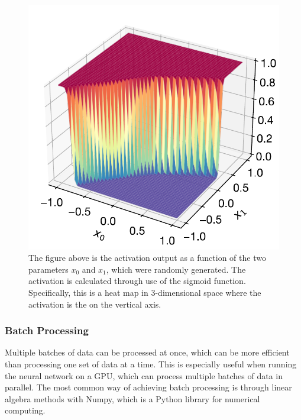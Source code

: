 \begin{figure}[H]
\centering
\includegraphics[scale=0.65]{../figures/activation_3d.pdf}
\caption{The figure above is the activation output as a function of the two parameters $x_0$ and $x_1$, which were randomly generated. The activation is calculated through use of the sigmoid function. Specifically, this is a heat map in 3-dimensional space where the activation is the on the vertical axis.}
\end{figure}

\subsubsection{Batch Processing}

Multiple batches of data can be processed at once, which can be more efficient than processing one set of data at a time. This is especially useful when running the neural network on a GPU, which can process multiple batches of data in parallel. The most common way of achieving batch processing is through linear algebra methods with Numpy, which is a Python library for numerical computing.

